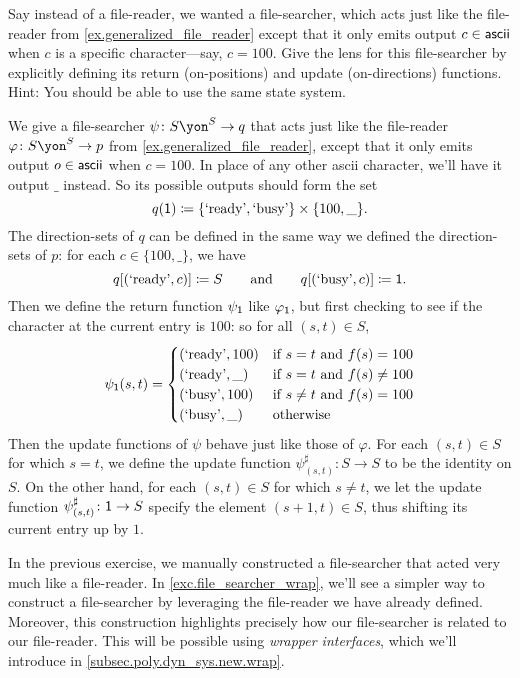 \documentclass[Book-Poly]{subfiles}
\begin{document}
\begin{exercise} \label{exc.file_searcher}
Say instead of a file-reader, we wanted a file-searcher, which acts just like the file-reader from \cref{ex.generalized_file_reader} except that it only emits output $c\in\mathsf{ascii}$ when $c$ is a specific character---say, $c=100$.
Give the lens for this file-searcher by explicitly defining its return (on-positions) and update (on-directions) functions.
Hint: You should be able to use the same state system.
\begin{solution}
We give a file-searcher $\psi\colon S\yon^S\to q$ that acts just like the file-reader $\varphi\colon S\yon^S\to p$ from \cref{ex.generalized_file_reader}, except that it only emits output $o\in\mathsf{ascii}$ when $c=100$.
In place of any other ascii character, we'll have it output $\_$ instead.
So its possible outputs should form the set
\[
    q(\textsf{1})\coloneqq\{\text{`ready'}, \text{`busy'}\}\times\{100,\_\}.
\]
The direction-sets of $q$ can be defined in the same way we defined the direction-sets of $p$: for each $c\in\{100,\_\}$, we have
\[
    q[(\text{`ready'}, c)]\coloneqq S \qquad\text{and}\qquad q[(\text{`busy'}, c)]\coloneqq\textsf{1}.
\]
Then we define the return function $\psi_{\textsf{1}}$ like $\varphi_{\textsf{1}}$, but first checking to see if the character at the current entry is $100$: so for all $(s,t)\in S$,
\begin{align*}
  \psi_{\textsf{1}}(s, t) =
  \begin{cases}
    (\text{`ready'}, 100) &\mbox{if $s=t$ and $f(s)=100$}\\
    (\text{`ready'}, \_) &\mbox{if $s=t$ and $f(s)\neq100$}\\
    (\text{`busy'}, 100) &\mbox{if $s\neq t$ and $f(s)=100$}\\
    (\text{`busy'}, \_) &\mbox{otherwise}\\
  \end{cases}
\end{align*}
Then the update functions of $\psi$ behave just like those of $\varphi$.
For each $(s,t)\in S$ for which $s=t$, we define the update function $\psi^\sharp_{(s,t)}\colon S\to S$ to be the identity on $S$.
On the other hand, for each $(s,t)\in S$ for which $s\neq t$, we let the update function $\psi^\sharp_{(s,t)}\colon \textsf{1}\to S$ specify the element $(s+1, t)\in S$, thus shifting its current entry up by $1$.
\end{solution}
\end{exercise}

In the previous exercise, we manually constructed a file-searcher that acted very much like a file-reader.
In \cref{exc.file_searcher_wrap}, we'll see a simpler way to construct a file-searcher by leveraging the file-reader we have already defined.
Moreover, this construction highlights precisely how our file-searcher is related to our file-reader.
This will be possible using \emph{wrapper interfaces}, which we'll introduce in \cref{subsec.poly.dyn_sys.new.wrap}.
\end{document}
